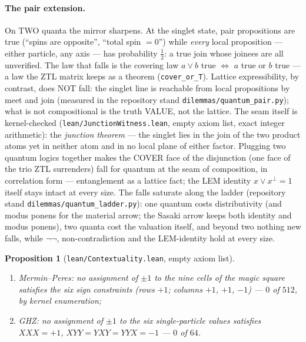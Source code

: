 \documentclass[11pt]{article}
\newtheorem{prop}[lem]{Proposition}
\theoremstyle{remark}
\begin{document}
\paragraph{The pair extension.} On TWO quanta the mirror sharpens. At the
singlet state, pair propositions are true (``spins are opposite'', ``total
spin $=0$'') while \emph{every} local proposition --- either particle, any
axis --- has probability $\tfrac12$: a true join whose joinees are all
unverified. The law that falls is the covering law $a\vee b$ true $\iff$
$a$ true or $b$ true --- a law the ZTL matrix keeps as a theorem
(\texttt{cover\_or\_T}). Lattice expressibility, by contrast, does NOT
fall: the singlet line is reachable from local propositions by meet and join
(measured in the repository stand \texttt{dilemmas/quantum\_pair.py}); what
is not compositional is the truth VALUE, not the lattice. The seam itself is
kernel-checked (\texttt{lean/JunctionWitness.lean}, empty axiom list, exact
integer arithmetic): the \emph{junction theorem} --- the singlet lies in the
join of the two product atoms yet in neither atom and in no local plane of
either factor. Plugging two quantum logics together makes the COVER face of
the disjunction (one face of the trio ZTL surrenders) fall for quantum at the
seam of composition, in correlation form --- entanglement as a lattice fact;
the LEM identity $x \vee x^{\perp} = 1$ itself stays intact at every size. The falls saturate
along the ladder (repository stand \texttt{dilemmas/quantum\_ladder.py}):
one quantum costs distributivity (and modus ponens for the material arrow;
the Sasaki arrow keeps both identity and modus ponens), two quanta cost the
valuation itself, and beyond two nothing new falls, while
$\neg\neg$, non-contradiction and the LEM-identity hold at every size.

\begin{prop}[\texttt{lean/Contextuality.lean}, empty axiom list]\label{propC}
\leavevmode
\begin{enumerate}
\item[(i)] \emph{Mermin--Peres}: no assignment of $\pm1$ to the nine cells
of the magic square satisfies the six sign constraints (rows $+1$; columns
$+1$, $+1$, $-1$) --- $0$ of $512$, by kernel enumeration;
\item[(ii)] \emph{GHZ}: no assignment of $\pm1$ to the six single-particle
values satisfies $XXX=+1$, $XYY=YXY=YYX=-1$ --- $0$ of $64$.
\end{enumerate}
\end{prop}
\end{document}
